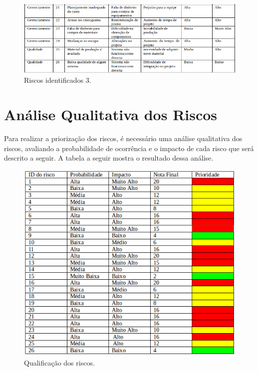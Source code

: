 	\begin{figure}[H]
		\centering
		\includegraphics[scale=0.6]{figuras/riscos3.png}
		\caption{Riscos identificados 3.}
		\label{img:risco3}
	\end{figure}
	

\section{Análise Qualitativa dos Riscos} %
\label{sec:análise_qualitativa_dos_riscos}

	Para realizar a priorização dos riscos, é necessário uma análise qualitativa dos riscos, avaliando a probabilidade de ocorrência e o impacto de cada risco que será descrito a seguir. A tabela a seguir mostra o resultado dessa análise.

	\begin{figure}[H]
		\centering
		\includegraphics[scale=0.8]{figuras/riscosQualitativo.png}
		\caption{Qualificação dos riscos.}
		\label{img:ear}
	\end{figure}

